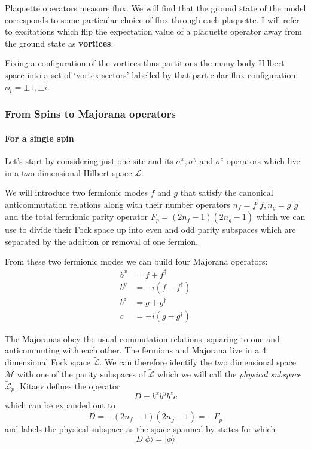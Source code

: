 Plaquette operators measure flux. We will find that the ground state of the model corresponds to some particular choice of flux through each plaquette. I will refer to excitations which flip the expectation value of a plaquette operator away from the ground state as \textbf{vortices}.

Fixing a configuration of the vortices thus partitions the many-body Hilbert space into a set of `vortex sectors' labelled by that particular flux configuration \(\phi_i = \pm 1,\pm i\).

\hypertarget{from-spins-to-majorana-operators}{%
\subsubsection{From Spins to Majorana operators}\label{from-spins-to-majorana-operators}}

\hypertarget{for-a-single-spin}{%
\paragraph{For a single spin}\label{for-a-single-spin}}

Let's start by considering just one site and its \(\sigma^x, \sigma^y\) and \(\sigma^z\) operators which live in a two dimensional Hilbert space \(\mathcal{L}\).

We will introduce two fermionic modes \(f\) and \(g\) that satisfy the canonical anticommutation relations along with their number operators \(n_f = f^\dagger f, n_g = g^\dagger g\) and the total fermionic parity operator \(F_p = (2n_f - 1)(2n_g - 1)\) which we can use to divide their Fock space up into even and odd parity subspaces which are separated by the addition or removal of one fermion.

From these two fermionic modes we can build four Majorana operators: \[\begin{aligned}
b^x &= f + f^\dagger\\
b^y &= -i(f - f^\dagger)\\
b^z &= g + g^\dagger\\
c   &= -i(g - g^\dagger)
\end{aligned}\]

The Majoranas obey the usual commutation relations, squaring to one and anticommuting with each other. The fermions and Majorana live in a 4 dimensional Fock space \(\mathcal{\tilde{L}}\). We can therefore identify the two dimensional space \(\mathcal{M}\) with one of the parity subspaces of \(\mathcal{\tilde{L}}\) which we will call the \emph{physical subspace} \(\mathcal{\tilde{L}}_p\). Kitaev defines the operator \[D = b^xb^yb^zc\] which can be expanded out to \[D = -(2n_f - 1)(2n_g - 1) = -F_p\] and labels the physical subspace as the space spanned by states for which \[ D|\phi\rangle = |\phi\rangle\]

